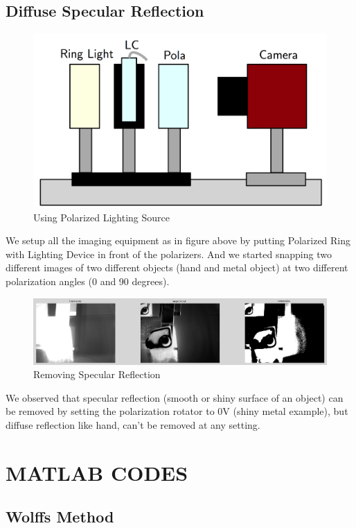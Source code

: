 \documentclass{article}
\begin{document}
	\subsection{Diffuse Specular Reflection}
	\begin{figure}[H]
	\centering
	\includegraphics[scale=0.2]{polaSetup4.png}
	\caption{Using Polarized Lighting Source}
	\end{figure}
	We setup all the imaging equipment as in figure above by putting Polarized Ring with Lighting Device in front of the polarizers. And we started snapping two different images of two different objects (hand and metal object) at two different polarization angles (0 and 90 degrees).
	\begin{figure}[H]
	\centering
	\includegraphics[scale=0.32]{diffuseSpecularReaction.png}
	\caption{Removing Specular Reflection}
	\end{figure}
	
We observed that specular reflection (smooth or shiny surface of an object) can be removed by setting the polarization rotator to 0V (shiny metal example), but diffuse reflection like hand, can’t be removed at any setting.


\section{MATLAB CODES}
	\subsection{Wolffs Method}
	
\end{document}
